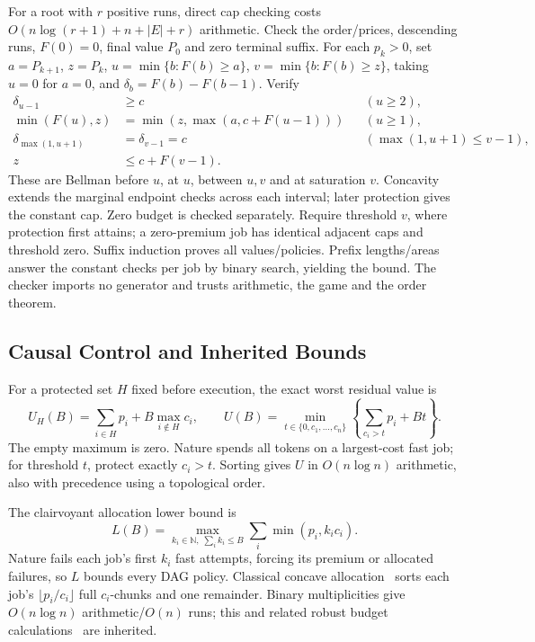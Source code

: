 \documentclass[acmsmall,screen,review,anonymous]{acmart}
\newcommand{\N}{\mathbb{N}}
\begin{document}
For a root with $r$ positive runs, direct cap checking costs $O(n\log(r+1)+n+|E|+r)$ arithmetic. Check the order/prices, descending runs, $F(0)=0$, final value $P_0$ and zero terminal suffix. For each $p_k>0$, set $a=P_{k+1}$, $z=P_k$, $u=\min\{b:F(b)\ge a\}$, $v=\min\{b:F(b)\ge z\}$, taking $u=0$ for $a=0$, and $\delta_b=F(b)-F(b-1)$. Verify
\begin{align*}
 \delta_{u-1}&\ge c &&(u\ge2),\\
 \min(F(u),z)&=\min(z,\max(a,c+F(u-1))) &&(u\ge1),\\
 \delta_{\max(1,u+1)}&=\delta_{v-1}=c &&(\max(1,u+1)\le v-1),\\
 z&\le c+F(v-1).
\end{align*}
These are Bellman before $u$, at $u$, between $u,v$ and at saturation $v$. Concavity extends the marginal endpoint checks across each interval; later protection gives the constant cap. Zero budget is checked separately. Require threshold $v$, where protection first attains; a zero-premium job has identical adjacent caps and threshold zero. Suffix induction proves all values/policies. Prefix lengths/areas answer the constant checks per job by binary search, yielding the bound. The checker imports no generator and trusts arithmetic, the game and the order theorem.

\subsection{Causal Control and Inherited Bounds}
\label{sec:bounds}

For a protected set $H$ fixed before execution, the exact worst residual value is
\begin{equation}
 U_H(B)=\sum_{i\in H}p_i+B\max_{i\notin H}c_i,\qquad
 U(B)=\min_{t\in\{0,c_1,\ldots,c_n\}}\left\{\sum_{c_i>t}p_i+Bt\right\}.
 \label{eq:fixed}
\end{equation}
The empty maximum is zero. Nature spends all tokens on a largest-cost fast job; for threshold $t$, protect exactly $c_i>t$. Sorting gives $U$ in $O(n\log n)$ arithmetic, also with precedence using a topological order.

The clairvoyant allocation lower bound is
\begin{equation}
 L(B)=\max_{k_i\in\N,\;\sum_i k_i\le B}\sum_i\min(p_i,k_ic_i).
 \label{eq:allocation}
\end{equation}
Nature fails each job's first $k_i$ fast attempts, forcing its premium or allocated failures, so $L$ bounds every DAG policy. Classical concave allocation~\cite{federgruen} sorts each job's $\lfloor p_i/c_i\rfloor$ full $c_i$-chunks and one remainder. Binary multiplicities give $O(n\log n)$ arithmetic/$O(n)$ runs; this and related robust budget calculations~\cite{bertsimas} are inherited.
\end{document}
